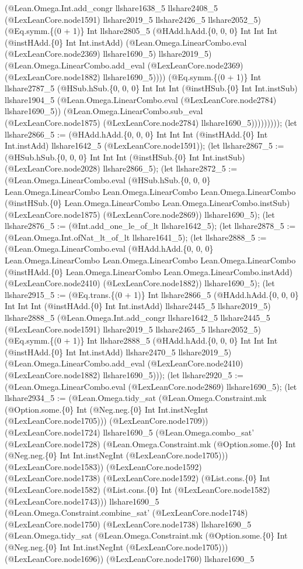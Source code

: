 \documentclass[11pt]{article}
\begin{document}
(@Lean.Omega.Int.add\_congr llshare1638\_5 llshare2408\_5 (@LexLeanCore.node1591) llshare2019\_5 llshare2426\_5 llshare2052\_5) (@Eq.symm.\{(0 + 1)\} Int llshare2805\_5 (@HAdd.hAdd.\{0, 0, 0\} Int Int Int (@instHAdd.\{0\} Int Int.instAdd) (@Lean.Omega.LinearCombo.eval (@LexLeanCore.node2369) llshare1690\_5) llshare2019\_5) (@Lean.Omega.LinearCombo.add\_eval (@LexLeanCore.node2369) (@LexLeanCore.node1882) llshare1690\_5)))) (@Eq.symm.\{(0 + 1)\} Int llshare2787\_5 (@HSub.hSub.\{0, 0, 0\} Int Int Int (@instHSub.\{0\} Int Int.instSub) llshare1904\_5 (@Lean.Omega.LinearCombo.eval (@LexLeanCore.node2784) llshare1690\_5)) (@Lean.Omega.LinearCombo.sub\_eval (@LexLeanCore.node1875) (@LexLeanCore.node2784) llshare1690\_5))))))))); (let llshare2866\_5 := (@HAdd.hAdd.\{0, 0, 0\} Int Int Int (@instHAdd.\{0\} Int Int.instAdd) llshare1642\_5 (@LexLeanCore.node1591)); (let llshare2867\_5 := (@HSub.hSub.\{0, 0, 0\} Int Int Int (@instHSub.\{0\} Int Int.instSub) (@LexLeanCore.node2028) llshare2866\_5); (let llshare2872\_5 := (@Lean.Omega.LinearCombo.eval (@HSub.hSub.\{0, 0, 0\} Lean.Omega.LinearCombo Lean.Omega.LinearCombo Lean.Omega.LinearCombo (@instHSub.\{0\} Lean.Omega.LinearCombo Lean.Omega.LinearCombo.instSub) (@LexLeanCore.node1875) (@LexLeanCore.node2869)) llshare1690\_5); (let llshare2876\_5 := (@Int.add\_one\_le\_of\_lt llshare1642\_5); (let llshare2878\_5 := (@Lean.Omega.Int.ofNat\_lt\_of\_lt llshare1641\_5); (let llshare2888\_5 := (@Lean.Omega.LinearCombo.eval (@HAdd.hAdd.\{0, 0, 0\} Lean.Omega.LinearCombo Lean.Omega.LinearCombo Lean.Omega.LinearCombo (@instHAdd.\{0\} Lean.Omega.LinearCombo Lean.Omega.LinearCombo.instAdd) (@LexLeanCore.node2410) (@LexLeanCore.node1882)) llshare1690\_5); (let llshare2915\_5 := (@Eq.trans.\{(0 + 1)\} Int llshare2866\_5 (@HAdd.hAdd.\{0, 0, 0\} Int Int Int (@instHAdd.\{0\} Int Int.instAdd) llshare2445\_5 llshare2019\_5) llshare2888\_5 (@Lean.Omega.Int.add\_congr llshare1642\_5 llshare2445\_5 (@LexLeanCore.node1591) llshare2019\_5 llshare2465\_5 llshare2052\_5) (@Eq.symm.\{(0 + 1)\} Int llshare2888\_5 (@HAdd.hAdd.\{0, 0, 0\} Int Int Int (@instHAdd.\{0\} Int Int.instAdd) llshare2470\_5 llshare2019\_5) (@Lean.Omega.LinearCombo.add\_eval (@LexLeanCore.node2410) (@LexLeanCore.node1882) llshare1690\_5))); (let llshare2920\_5 := (@Lean.Omega.LinearCombo.eval (@LexLeanCore.node2869) llshare1690\_5); (let llshare2934\_5 := (@Lean.Omega.tidy\_sat (@Lean.Omega.Constraint.mk (@Option.some.\{0\} Int (@Neg.neg.\{0\} Int Int.instNegInt (@LexLeanCore.node1705))) (@LexLeanCore.node1709)) (@LexLeanCore.node1724) llshare1690\_5 (@Lean.Omega.combo\_sat' (@LexLeanCore.node1728) (@Lean.Omega.Constraint.mk (@Option.some.\{0\} Int (@Neg.neg.\{0\} Int Int.instNegInt (@LexLeanCore.node1705))) (@LexLeanCore.node1583)) (@LexLeanCore.node1592) (@LexLeanCore.node1738) (@LexLeanCore.node1592) (@List.cons.\{0\} Int (@LexLeanCore.node1582) (@List.cons.\{0\} Int (@LexLeanCore.node1582) (@LexLeanCore.node1743))) llshare1690\_5 (@Lean.Omega.Constraint.combine\_sat' (@LexLeanCore.node1748) (@LexLeanCore.node1750) (@LexLeanCore.node1738) llshare1690\_5 (@Lean.Omega.tidy\_sat (@Lean.Omega.Constraint.mk (@Option.some.\{0\} Int (@Neg.neg.\{0\} Int Int.instNegInt (@LexLeanCore.node1705))) (@LexLeanCore.node1696)) (@LexLeanCore.node1760) llshare1690\_5 
\end{document}

